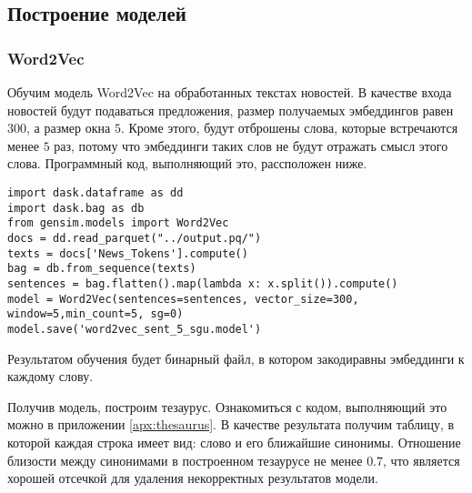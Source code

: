 \documentclass[coursework]{SCWorks}
\begin{document}
\subsection{Построение моделей}
\subsubsection{Word2Vec}
Обучим модель Word2Vec на обработанных текстах новостей. В качестве входа новостей будут подаваться предложения, размер получаемых эмбеддингов равен $300$, а размер окна $5$. Кроме этого, будут отброшены слова, которые встречаются менее $5$ раз, потому что эмбеддинги таких слов не будут отражать смысл этого слова. Программный код, выполняющий это, рассположен ниже.
\begin{verbatim}
import dask.dataframe as dd
import dask.bag as db
from gensim.models import Word2Vec
docs = dd.read_parquet("../output.pq/")
texts = docs['News_Tokens'].compute()
bag = db.from_sequence(texts)
sentences = bag.flatten().map(lambda x: x.split()).compute()
model = Word2Vec(sentences=sentences, vector_size=300, window=5,min_count=5, sg=0)
model.save('word2vec_sent_5_sgu.model')
\end{verbatim}

Результатом обучения будет бинарный файл, в котором закодиравны эмбеддинги к каждому слову.

Получив модель, построим тезаурус. Ознакомиться с кодом, выполняющий это можно в приложении \ref{apx:thesaurus}. В качестве результата получим таблицу, в которой каждая строка имеет вид: слово и его ближайшие синонимы. Отношение близости между синонимами в построенном тезаурусе не менее $0.7$, что является хорошей отсечкой для удаления некорректных результатов модели.
\end{document}
